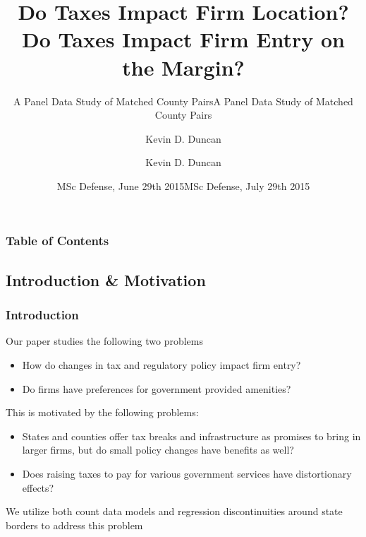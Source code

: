 \documentclass{beamer}
\title{Do Taxes Impact Firm Location?}
\subtitle{A Panel Data Study of Matched County Pairs}
\author{Kevin D. Duncan}
\institute{Iowa State University}
\date{MSc Defense, June 29th 2015}
\begin{document}
\begin{frame}
\title{Do Taxes Impact Firm Entry on the Margin?}
\subtitle{A Panel Data Study of Matched County Pairs}
\author{Kevin D. Duncan}
\date{MSc Defense, July 29th 2015}
\maketitle
\end{frame}

\begin{frame}
\frametitle{Table of Contents}
\tableofcontents
\end{frame}

\begin{frame}
\section{Introduction \& Motivation}
\frametitle{Introduction}
Our paper studies the following two problems
\begin{itemize}
\item How do changes in tax and regulatory policy impact firm entry?
\item Do firms have preferences for government provided amenities?
\end{itemize}

This is motivated by the following problems:
\begin{itemize}
\item States and counties offer tax breaks and infrastructure as promises to bring in larger firms, but do small policy changes have benefits as well?
\item Does raising taxes to pay for various government services have distortionary effects?
\end{itemize}
We utilize both count data models and regression discontinuities around state borders to address this problem
\end{frame}
\end{document}
